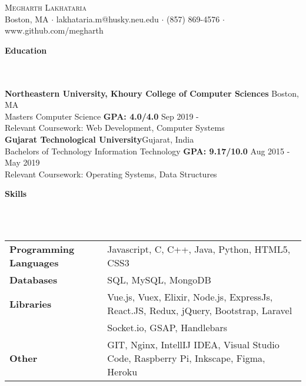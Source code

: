 \documentclass[]{article}
\newcommand{\lineunder} {
    \vspace*{-8pt} \\
    \hrulefill \\
}
\newcommand{\header} [1] {
    {\vspace*{6pt} \fontsize{12}{12}\selectfont \textbf{#1}}
     \lineunder
}
\begin{document}
\vspace*{-40pt}

    

\begin{center}
	{\LARGE \scshape {Megharth Lakhataria}}\\
	Boston, MA $\cdot$ lakhataria.m@husky.neu.edu $\cdot$ (857) 869-4576 $\cdot$ www.github.com/megharth\\
\end{center}

\header{Education}
\hspace{1mm}
\textbf{Northeastern University, Khoury College of Computer Sciences}
\hfill
Boston, MA\\
\hspace{1mm}
Masters Computer Science \textbf{GPA: 4.0/4.0} \hfill Sep 2019 - \\
\hspace{1mm}
Relevant Coursework: Web Development, Computer Systems \\
\vspace{2mm}
\hspace{1mm}
\textbf{Gujarat Technological University}\hfill Gujarat, India\\
\hspace{1mm}
Bachelors of Technology Information Technology \textbf{GPA: 9.17/10.0} \hfill
Aug 2015 - May 2019\\
\hspace{1mm}
Relevant Coursework: Operating Systems, Data Structures \\
\vspace{2mm}


\header{Skills}
\vspace{1mm}
\begin{tabular}{ l l }
	\textbf{Programming Languages} & Javascript, C, C++, Java, Python, HTML5, CSS3            \\
	\textbf{Databases}             & SQL, MySQL, MongoDB                                      \\
    
    \textbf{Libraries}             & Vue.js, Vuex, Elixir, Node.js, ExpressJs, React.JS,
    Redux, jQuery, Bootstrap, Laravel  \\
                          & Socket.io, GSAP, Handlebars \\
    
    \textbf{Other}                & GIT, Nginx, IntellIJ IDEA, Visual Studio Code,
    Raspberry Pi, Inkscape, Figma, Heroku \\          
\end{tabular}
\vspace{2mm}
\end{document}
